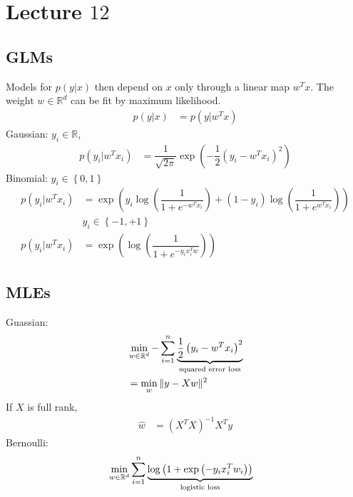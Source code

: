 \documentclass{article}
\begin{document}
\section{Lecture $12$} 


\subsection{GLMs}
Models for $p\left(y | x \right) $ then depend on $x $ only through a linear map $w^{T} x $. The weight $w  \in \mathbb{R}^{d}$ can be fit by maximum likelihood.
\begin{align*}
p\left(y | x\right)  &= p\left(y | w^{T} x\right)
\end{align*}
Gaussian: $y_{i} \in \mathbb{R}$,
\begin{align*}
p\left(y_{i} | w^{T} x_{i}\right)  &= \dfrac{1}{\sqrt{2 \pi}} \exp\left(- \dfrac{1}{2} \left(y_{i} - w^{T} x_{i}\right)^{2}\right)
\end{align*}
Binomial: $y_{i} \in \left\{0, 1\right\}$
\begin{align*}
p\left(y_{i} | w^{T} x_{i}\right)  &= \exp\left(y_{i} \log\left(\dfrac{1}{1 + e^{- w^{T} x_{i}}}\right) + \left(1 - y_{i}\right) \log\left(\dfrac{1}{1 + e^{w^{T} x_{i}}}\right)\right)
\\ &  y_{i} \in \left\{-1, +1\right\}
\\ p\left(y_{i} | w^{T} x_{i}\right)  &= \exp\left(\log\left(\dfrac{1}{1 + e^{-y_{i} x_{i}^{T} w}}\right)\right)
\end{align*}


\subsection{MLEs}
Guassian:
\begin{align*}
&  \displaystyle\min_{w \in \mathbb{R}^{d}} - \displaystyle\sum_{i=1}^{n} \underbrace{\dfrac{1}{2} \left(y_{i} - w^{T} x_{i}\right)^{2}}_{\text{\;squared error loss\;}}
\\ &= \displaystyle\min_{w} \| y - X w \|^{2}
\end{align*}
If $X $ is full rank,
\begin{align*}
\hat{w} &= \left(X^{T} X\right)^{-1} X^{T} y 
\end{align*}
Bernoulli:
\begin{align*}
&\displaystyle\min_{w \in \mathbb{R}^{d}} \displaystyle\sum_{i=1}^{n} \underbrace{\log\left(1 + \exp\left(-y_{i} x^{T}_{i} w_{i}\right)\right)}_{\text{\;logistic loss\;}}
\end{align*}
\end{document}
